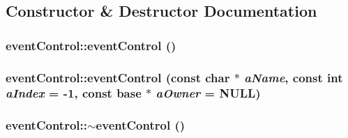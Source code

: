 \subsection{Constructor \& Destructor Documentation}
\hypertarget{classevent_control_a2e603f04482f16adc39d44adeb835aea}{
\subsubsection[{eventControl}]{\setlength{\rightskip}{0pt plus 5cm}eventControl::eventControl ()}}
\label{classevent_control_a2e603f04482f16adc39d44adeb835aea}
\hypertarget{classevent_control_aa1a3811220714c42da10044e57034b7d}{
\subsubsection[{eventControl}]{\setlength{\rightskip}{0pt plus 5cm}eventControl::eventControl (const char $\ast$ {\em aName}, \/  const int {\em aIndex} = {\ttfamily -\/1}, \/  const {\bf base} $\ast$ {\em aOwner} = {\ttfamily NULL})}}
\label{classevent_control_aa1a3811220714c42da10044e57034b7d}
\hypertarget{classevent_control_a9c9efcb383c5839f410c676e1379cfb3}{
\subsubsection[{$\sim$eventControl}]{\setlength{\rightskip}{0pt plus 5cm}eventControl::$\sim$eventControl ()}}
\label{classevent_control_a9c9efcb383c5839f410c676e1379cfb3}


